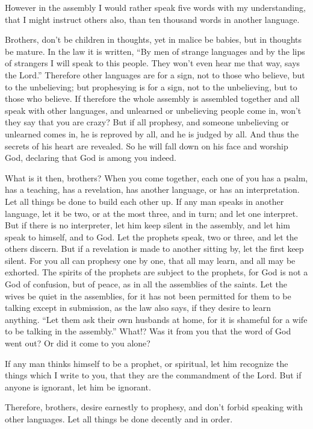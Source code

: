 {However in the assembly I would rather speak five words with my understanding, that I might instruct others also, than ten thousand words in another language.
\par }{\PP {}Brothers, don’t be children in thoughts, yet in malice be babies, but in thoughts be mature.
In the law it is written, “By men of strange languages and by the lips of strangers I will speak to this people. They won’t even hear me that way, says the Lord.”
Therefore other languages are for a sign, not to those who believe, but to the unbelieving; but prophesying is for a sign, not to the unbelieving, but to those who believe.
If therefore the whole assembly is assembled together and all speak with other languages, and unlearned or unbelieving people come in, won’t they say that you are crazy?
But if all prophesy, and someone unbelieving or unlearned comes in, he is reproved by all, and he is judged by all.
And thus the secrets of his heart are revealed. So he will fall down on his face and worship God, declaring that God is among you indeed.
\par }{\PP {}What is it then, brothers? When you come together, each one of you has a psalm, has a teaching, has a revelation, has another language, or has an interpretation. Let all things be done to build each other up.
If any man speaks in another language, let it be two, or at the most three, and in turn; and let one interpret.
But if there is no interpreter, let him keep silent in the assembly, and let him speak to himself, and to God.
Let the prophets speak, two or three, and let the others discern.
But if a revelation is made to another sitting by, let the first keep silent.
For you all can prophesy one by one, that all may learn, and all may be exhorted.
The spirits of the prophets are subject to the prophets,
for God is not a God of confusion, but of peace, as in all the assemblies of the saints.
Let the wives be quiet in the assemblies, for it has not been permitted for them to be talking except in submission, as the law also says,
if they desire to learn anything. “Let them ask their own husbands at home, for it is shameful for a wife to be talking in the assembly.”
What!? Was it from you that the word of God went out? Or did it come to you alone?
\par }{\PP {}If any man thinks himself to be a prophet, or spiritual, let him recognize the things which I write to you, that they are the commandment of the Lord.
But if anyone is ignorant, let him be ignorant.
\par }{\PP {}Therefore, brothers, desire earnestly to prophesy, and don’t forbid speaking with other languages.
Let all things be done decently and in order.

}
